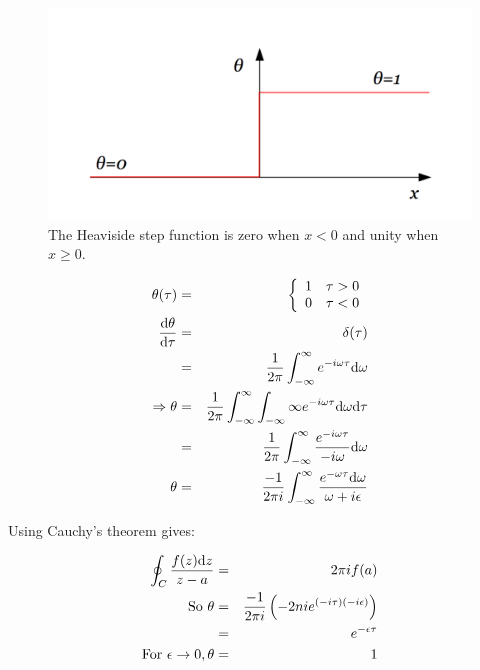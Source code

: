\begin{figure}[!htb]
  \begin{center}
    \includegraphics[width=\textwidth]{images/chapter_4/heaviside.pdf}
    \caption[The Heaviside step function]{The Heaviside step function is zero when $x<0$ and unity when $x\ge 0$.}
    \label{fig:ch4_heaviside}
  \end{center}
\end{figure}

\begin{eqnarray*}
  \theta(\tau) & = &
  \left\{
    \begin{array}{cc}
    1 & \tau>0 \\
    0 & \tau<0
    \end{array}
  \right.
  \\
  \frac{\mathrm{d}\theta}{\mathrm{d}\tau} & = & \delta (\tau) \\
  & = & \frac{1}{2\pi} \int_{-\infty}^{\infty}e^{-i\omega\tau}\mathrm{d}\omega \\
  \Rightarrow \theta & = & \frac{1}{2\pi}\int_{-\infty}^{\infty}\int_{-\infty}{\infty}e^{-i\omega\tau}\mathrm{d}\omega \mathrm{d}\tau \\
  & = & \frac{1}{2\pi} \int_{-\infty}^{\infty} \frac{e^{-i\omega\tau}}{-i\omega}\mathrm{d}\omega \\
  \theta & = & \frac{-1}{2\pi i}\int_{-\infty}^{\infty} \frac{e^{-\omega\tau}\mathrm{d}\omega}{\omega + i\epsilon} \\
\end{eqnarray*}

Using Cauchy's theorem gives:

\begin{eqnarray*}
  \oint_C \frac{f(z)\mathrm{d}z}{z-a} & = & 2\pi i f(a) \\
  \textrm{So } \theta & = & \frac{-1}{2\pi i} \left(-2nie^{(-i\tau)(-i\epsilon)}\right) \\
  & = & e^{-\epsilon\tau} \\
  \textrm{For } \epsilon \to 0, \theta & = & 1
\end{eqnarray*}
